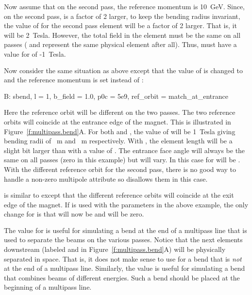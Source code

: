 Now assume that on the second pass, the reference momentum is 10~GeV.
Since, on the second pass,  is a factor of 2 larger, to keep
the bending radius invariant, the value of  for the second
pass element  will be a factor of 2 larger. That is, it will
be 2~Tesla. However, the total field in the element must be the
same on all passes ( and  represent the same
physical element after all). Thus,  must have a value for
 of -1~Tesla.

Now consider the same situation as above except that the value of
 is changed to  and the reference
momentum is set instead of :
\begin{example} 
  B: sbend, l = 1, b_field = 1.0, p0c = 5e9, ref_orbit = match_at_entrance
\end{example}
Here the reference orbit will be different on the two passes. The two
reference orbits will coincide at the entrance edge of the magnet.
This is illustrated in Figure~\ref{f:multipass.bend}A. For both
 and , the value of  will be 1~Tesla
giving bending radii of ~m and ~m respectively. With
, the element length will be a slight bit larger than
 with a value of . The entrance face angle
 will always be the same on all passes (zero in this example)
but  will vary. In this case  for  will be
. With the different reference orbit for the second pass,
there is no good way to handle a non-zero multipole attribute so \bmad
disallows them in this case.

 is similar to  except that
the different reference orbits will coincide at the exit edge of the
magnet. If  is used with the parameters in the above
example, the only change for  is that  will now be
 and  will be zero.

The  value for  is useful
for simulating a bend at the end of a multipass line that is used to
separate the beams on the various passes. Notice that the next
elements downstream (labeled  and  in
Figure~\ref{f:multipass.bend}A) will be physically separated in
space. That is, it does not make sense to use 
for a bend that is {\em not} at the end of a multipass
line. Similarly, the  value is useful for simulating
a bend that combines beams of different energies. Such a bend should
be placed at the beginning of a multipass line.

